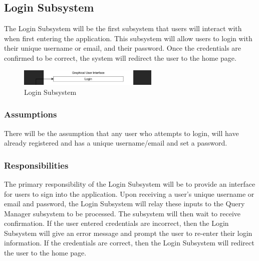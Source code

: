 
\subsection{Login Subsystem}
The Login Subsystem will be the first subsystem that users will interact with when first entering the application. This subsystem will allow users to login with their unique username or email, and their password. Once the credentials are confirmed to be correct, the system will redirect the user to the home page. 

\begin{figure}[h!]
	\centering
 	\includegraphics[width=0.60\textwidth]{images/login}
 \caption{Login Subsystem}
\end{figure}

\subsubsection{Assumptions}
There will be the assumption that any user who attempts to login, will have already registered and has a unique username/email and set a password.

\subsubsection{Responsibilities}
The primary responsibility of the Login Subsystem will be to provide an interface for users to sign into the application. Upon receiving a user's unique username or email and password, the Login Subsystem will relay these inputs to the Query Manager subsystem to be processed. The subsystem will then wait to receive confirmation. If the user entered credentials are incorrect, then the Login Subsystem will give an error message and prompt the user to re-enter their login information. If the credentials are correct, then the Login Subsystem will redirect the user to the home page.

